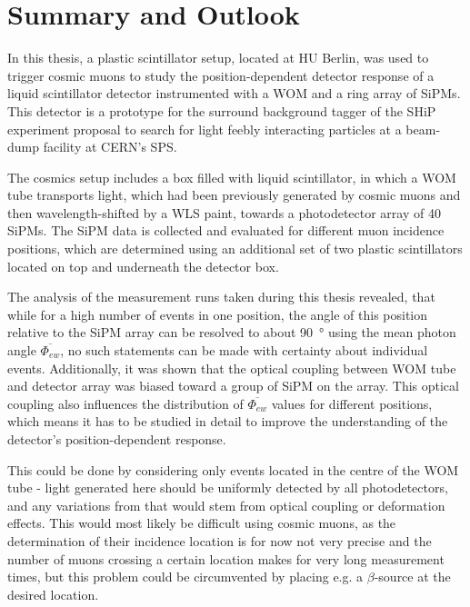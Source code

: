 \chapter{Summary and Outlook}

	In this thesis, a plastic scintillator setup, located at \ac{HU} Berlin, was used to trigger cosmic muons to study the position-dependent detector response of a liquid scintillator detector instrumented with a \ac{WOM} and a ring array of \acsp{SiPM}. This detector is a prototype for the surround background tagger of the \ac{SHiP} experiment proposal to search for light feebly interacting particles at a beam-dump facility at \ac{CERN}'s \ac{SPS}. 	
	
	The cosmics setup includes a box filled with liquid scintillator, in which a \ac{WOM} tube transports light, which had been previously generated by cosmic muons and then wavelength-shifted by a \ac{WLS} paint, towards a photodetector array of 40 \acsp{SiPM}. The \ac{SiPM} data is collected and evaluated for different muon incidence positions, which are determined using an additional set of two plastic scintillators located on top and underneath the detector box. 
	
	The analysis of the measurement runs taken during this thesis revealed, that while for a high number of events in one position, the angle of this position relative to the \ac{SiPM} array can be resolved to about \SI{90}{\degree} using the mean photon angle $\overline{\Phi_{ew}}$, no such statements can be made with certainty about individual events. Additionally, it was shown that the optical coupling between \ac{WOM} tube and detector array was biased toward a group of \ac{SiPM} on the array. This optical coupling also influences the distribution of $\overline{\Phi_{ew}}$ values for different positions, which means it has to be studied in detail to improve the understanding of the detector's position-dependent response.
	
	This could be done by considering only events located in the centre of the \ac{WOM} tube - light generated here should be uniformly detected by all photodetectors, and any variations from that would stem from optical coupling or deformation effects. This would most likely be difficult using cosmic muons, as the determination of their incidence location is for now not very precise and the number of muons crossing a certain location makes for very long measurement times, but this problem could be circumvented by placing e.g. a $\beta$-source at the desired location. 
	
